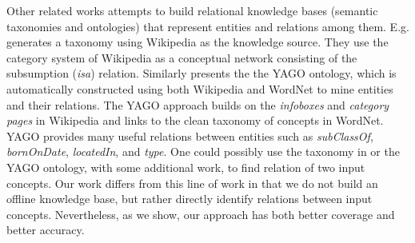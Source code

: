 Other related works attempts to build relational knowledge bases
(semantic taxonomies and ontologies) that represent entities and
relations among them. E.g. \cite{wikitaxo07} generates a taxonomy
using Wikipedia as the knowledge source. They use the category system
of Wikipedia as a conceptual network consisting of the subsumption
({\em isa}) relation. Similarly \cite{suchanek2007WWW} presents the
the YAGO ontology, which is automatically constructed using both
Wikipedia and WordNet to mine entities and their relations. The YAGO
approach builds on the {\em infoboxes} and {\em category pages} in
Wikipedia and links to the clean taxonomy of concepts in WordNet. YAGO
provides many useful relations between entities such as {\em
  subClassOf}, {\em bornOnDate}, {\em locatedIn}, and {\em type}. One
could possibly use the taxonomy in \cite{wikitaxo07} or the YAGO
ontology, with some additional work, to find relation of two input
concepts. Our work differs from this line of work in that we do not
build an offline knowledge base, but rather directly identify
relations between input concepts. Nevertheless, as we show, our
approach has both better coverage and better accuracy.








